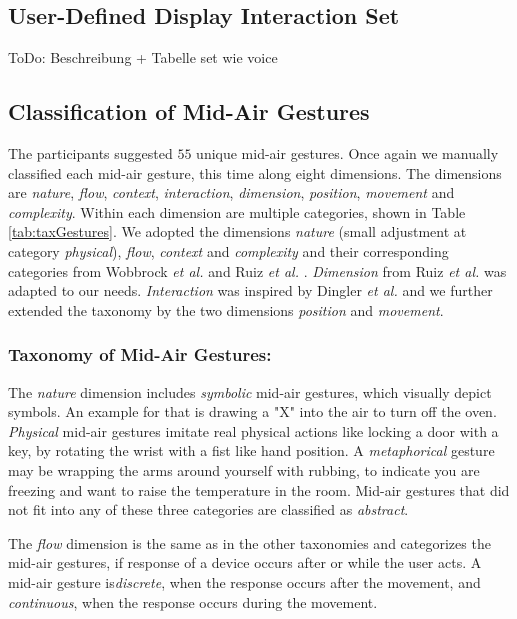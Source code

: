 \documentclass[sigchi]{acmart}
\begin{document}
	\subsection{User-Defined Display Interaction Set}
	ToDo: Beschreibung + Tabelle set wie voice
	\subsection{Classification of Mid-Air Gestures}
	The participants suggested $55$ unique mid-air gestures. Once again we manually classified each mid-air gesture, this time along eight dimensions. The dimensions are \textit{nature}, \textit{flow}, \textit{context}, \textit{interaction}, \textit{dimension}, \textit{position}, \textit{movement} and \textit{complexity}. Within each dimension are multiple categories, shown in Table \ref{tab:taxGestures}. We adopted the dimensions \textit{nature} (small adjustment at category \textit{physical}), \textit{flow}, \textit{context} and \textit{complexity} and their corresponding categories from Wobbrock \textit{et al.} \citep{Wobbrock.2009} and Ruiz \textit{et al.} \citep{Ruiz.2011}. \textit{Dimension} from Ruiz \textit{et al.} \citep{Ruiz.2011} was adapted to our needs. \textit{Interaction} was inspired by Dingler \textit{et al.} \citep{Dingler.2018} and we further extended the taxonomy by the two dimensions \textit{position} and \textit{movement}.
	\subsubsection{Taxonomy of Mid-Air Gestures:}
	The \textit{nature} dimension includes \textit{symbolic} mid-air gestures, which visually depict symbols. An example for that is drawing a "X" into the air to turn off the oven. \textit{Physical} mid-air gestures imitate real physical actions like locking a door with a key, by rotating the wrist with a fist like hand position. A \textit{metaphorical} gesture may be wrapping the arms around yourself with rubbing, to indicate you are freezing and want to raise the temperature in the room. Mid-air gestures that did not fit into any of these three categories are classified as \textit{abstract}.
	
	The \textit{flow} dimension is the same as in the other taxonomies  and categorizes the mid-air gestures, if response of a device occurs after or while the user acts. A mid-air gesture is\textit{discrete}, when the response occurs after the movement, and \textit{continuous}, when the response occurs during the movement. 
	
\end{document}
